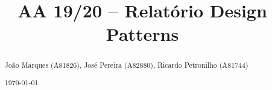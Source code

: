 \documentclass[acmsmall,nonacm,screen]{acmart}
\begin{document}
\title{AA 19/20 -- Relatório Design Patterns}
\makeatletter \renewcommand{\shortauthors}{\@title} \makeatother

\begin{abstract}
\large
\vspace*{-.8\baselineskip}
João Marques (A81826), José Pereira (A82880), Ricardo Petronilho (A81744)
\vspace*{.4\baselineskip}
\par \noindent \today
\vspace*{.25\baselineskip}
\end{abstract}

\maketitle





\end{document}
